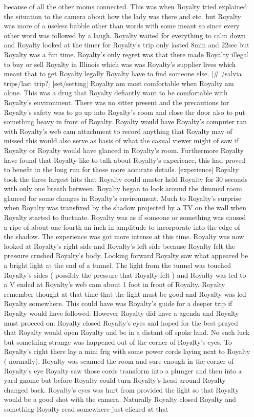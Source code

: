 \documentclass[12pt]{book}
\begin{document}
because of all the other rooms connected. This was when Royalty tried explained the situation to the camera about how the lady was there and etc. but Royalty was more of a useless babble other than words with some meant so since every other word was followed by a laugh. Royalty waited for everything to calm down and Royalty looked at the timer for Royalty's trip only lasted 8min and 22sec but Royalty was a fun time. Royalty's only regret was that there made Royalty illegal to buy or sell Royalty in Illinois which was was Royalty's supplier lives which meant that to get Royalty legally Royalty have to find someone else. [\# /salvia trips/last trip?] [set/setting] Royalty am most comfortable when Royalty am alone. This was a drug that Royalty defiantly want to be comfortable with Royalty's environment. There was no sitter present and the precautions for Royalty's safety was to go up into Royalty's room and close the door also to put something heavy in front of Royalty. Royalty would have Royalty's computer ran with Royalty's web cam attachment to record anything that Royalty may of missed this would also serve as basis of what the casual viewer might of saw if Royalty or Royalty would have glanced in Royalty's room. Furthermore Royalty have found that Royalty like to talk about Royalty's experience, this had proved to benefit in the long run for those more accurate details. [experience] Royalty took the three largest hits that Royalty could muster held Royalty for 30 seconds with only one breath between. Royalty began to look around the dimmed room glanced for some changes in Royalty's environment. Much to Royalty's surprise when Royalty was transfixed by the shadow projected by a TV on the wall when Royalty started to fluctuate. Royalty was as if someone or something was caused a ripe of about one fourth an inch in amplitude to incorporate into the edge of the shadow. The experience was got more intense at this time. Royalty was now looked at Royalty's right side and Royalty's left side because Royalty felt the pressure crushed Royalty's body. Looking forward Royalty saw what appeared be a bright light at the end of a tunnel. The light from the tunnel was touched Royalty's sides ( possibly the pressure that Royalty felt ) and Royalty was led to a V ended at Royalty's web cam about 1 foot in front of Royalty. Royalty remember thought at that time that the light must be good and Royalty was led Royalty somewhere. This could have was Royalty's guide for a deeper trip if Royalty would have followed. However Royalty did have a agenda and Royalty must proceed on. Royalty closed Royalty's eyes and hoped for the best prayed that Royalty would open Royalty and be in a distant off spoke land. No such luck but something strange was happened out of the corner of Royalty's eyes. To Royalty's right there lay a mini frig with some power cords laying next to Royalty ( normally). Royalty was scanned the room and sure enough in the corner of Royalty's eye Royalty saw those cords transform into a plunger and then into a yard gnome but before Royalty could turn Royalty's head around Royalty changed back. Royalty's eyes was hurt from provided the light so that Royalty would be a good shot with the camera. Naturally Royalty closed Royalty and something Royalty read somewhere just clicked at that 
\end{document}
